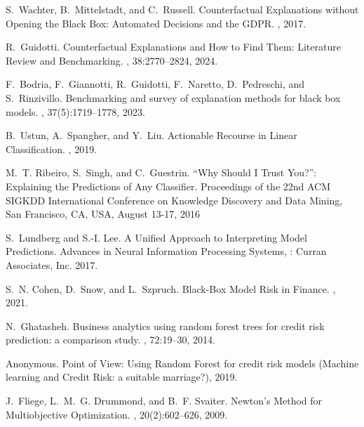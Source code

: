 \documentclass[12pt]{extarticle}
\numberwithin{equation}{section}
\begin{document}
\begin{thebibliography}{99}

S.~Wachter, B.~Mittelstadt, and C.~Russell.
\newblock Counterfactual Explanations without Opening the Black Box: Automated Decisions and the GDPR.
, 2017.

R.~Guidotti.
\newblock Counterfactual Explanations and How to Find Them: Literature Review and Benchmarking.
, 38:2770--2824, 2024.

F.~Bodria, F.~Giannotti, R.~Guidotti, F.~Naretto, D.~Pedreschi, and S.~Rinzivillo.
\newblock Benchmarking and survey of explanation methods for black box models.
, 37(5):1719--1778, 2023.

B.~Ustun, A.~Spangher, and Y.~Liu.
\newblock Actionable Recourse in Linear Classification.
, 2019.

M.~T. Ribeiro, S.~Singh, and C.~Guestrin.
\newblock ``Why Should I Trust You?'': Explaining the Predictions of Any Classifier.
\newblock Proceedings of the 22nd {ACM} {SIGKDD} International Conference on
               Knowledge Discovery and Data Mining, San Francisco, CA, USA, August
               13-17, 2016

S.~Lundberg and S.-I. Lee.
\newblock A Unified Approach to Interpreting Model Predictions.
\newblock Advances in Neural Information Processing Systems, : Curran Associates, Inc. 2017.

S.~N. Cohen, D.~Snow, and L.~Szpruch.
\newblock Black-Box Model Risk in Finance.
, 2021.

N.~Ghatasheh.
\newblock Business analytics using random forest trees for credit risk prediction: a comparison study.
, 72:19--30, 2014.

Anonymous.
\newblock Point of View: Using Random Forest for credit risk models (Machine learning and Credit Risk: a suitable marriage?), 2019.

J.~Fliege, L.~M.~G. Drummond, and B.~F. Svaiter.
\newblock Newton's Method for Multiobjective Optimization.
, 20(2):602--626, 2009.


\end{thebibliography}
\end{document}
